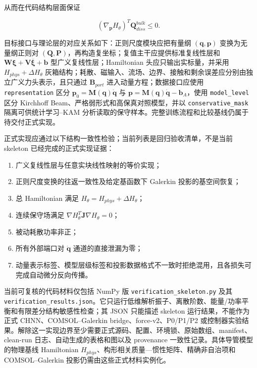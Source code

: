 从而在代码结构层面保证

\begin{equation}
\label{eq:chnn-4-34}
\left( \nabla_{\mathbf{p}}H_{\theta} \right)^{T}\mathbf{Q}_{diss}^{bulk} \leq 0.
\end{equation}

目标接口与理论层的对应关系如下：正则尺度模块应把有量纲 \(\left( \mathbf{q},\mathbf{p} \right)\) 变换为无量纲正则对 \(\left( \mathbf{Q},\mathbf{P} \right)\)，再构造复坐标；复值主干应提供标准复线性层和 \(\mathbf{W}\bm{\xi} + \mathbf{V}\overline{\bm{\xi}} + \mathbf{b}\) 型广义复线性层；Hamiltonian 头应只输出实标量，并采用 \(H_{phys} + \Delta H_{\theta}\) 灰箱结构；耗散、磁输入、流场、边界、接触和剩余误差应分别由独立广义力头表示，且只通过 \(\mathbf{B}_{port}\) 进入动量方程；数据接口应使用 \texttt{representation} 区分 \(\mathbf{p}_{0} = \mathbf{M}\left( \mathbf{q} \right)\dot{\mathbf{q}}\) 与 \(\mathbf{p} = \mathbf{M}\left( \mathbf{q} \right)\dot{\mathbf{q}} - \mathbf{b}_{A}\)，使用 \texttt{model\_level} 区分 Kirchhoff Beam、严格弱形式和高保真对照模型，并以 \texttt{conservative\_mask} 隔离可供统计学习--KAM 分析读取的保守样本。完整训练流程和比较基线仍属于待交付正式实现。

正式实现应通过以下结构一致性检验；当前列表是回归验收清单，不是当前 skeleton 已经完成的正式实现证据：

\begin{enumerate}
\def\labelenumi{\arabic{enumi}.}
\tightlist
\item
  广义复线性层与任意实块线性映射的等价实现；
\item
  正则尺度变换的往返一致性及给定基函数下 Galerkin 投影的基空间恢复；
\item
  总 Hamiltonian 满足 \(H_{\theta} = H_{phys} + \Delta H_{\theta}\)；
\item
  连续保守场满足 \(\nabla H_{\theta}^{T}\mathbf{J}\nabla H_{\theta} = 0\)；
\item
  被动耗散功率非正；
\item
  所有外部端口对 \(\dot{\mathbf{q}}\) 通道的直接泄漏为零；
\item
  动量表示标签、模型层级标签和投影数据格式不一致时拒绝混用，且各损失可完成自动微分反向传播。
\end{enumerate}

\begin{sloppypar}
当前可复核的代码材料仅包括 NumPy 版 \texttt{verification\_skeleton.py} 及其 \texttt{verification\_results.json}。它只运行低维解析振子、离散阶数、能量/功率平衡和有限差分结构敏感性检查；其 JSON 只能描述 skeleton 运行结果，不能作为正式 CHNN、COMSOL--Galerkin bridge、force-v2、P0/P1/P2 或控制器实验结果。解除这一实现边界至少需要正式源码、配置、环境锁、原始数组、manifest、clean-run 日志、自动生成的表格和图以及 provenance 一致性记录。具体导管模型的物理基线 Hamiltonian \({\widehat{H}}_{phys}\)、构形相关质量---惯性矩阵、精确非自治项和 COMSOL--Galerkin 投影仍需由这些正式材料实例化。
\end{sloppypar}

